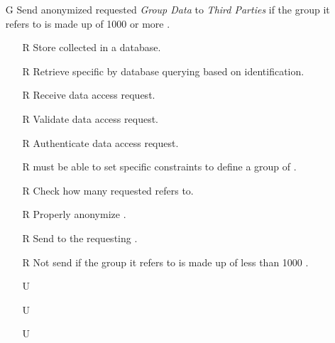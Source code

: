 \documentclass[../../rasd.tex]{subfiles}
\begin{document}
\begin{itemize}
            \item[G\subs{3}]Send anonymized requested \textit{Group Data} to \textit{Third Parties} if the group it refers to is made up of 1000 or more .
            \begin{itemize}
                \item[R\subs{11}]Store collected  in a database.
                \item[R\subs{12}]Retrieve specific  by database querying based on  identification.
                \item[R\subs{13}]Receive  data access request.
                \item[R\subs{14}]Validate  data access request.
                \item[R\subs{15}]Authenticate  data access request.
                \item[R\subs{21}] must be able to set specific constraints to define a group of .
                \item[R\subs{22}]Check how many  requested  refers to.
                \item[R\subs{23}]Properly anonymize .
                \item[R\subs{24}]Send  to the requesting .
                \item[R\subs{25}]Not send  if the group it refers to is made up of less than 1000 .
                \\
                \item[U\subs{2}] 
                \item[U\subs{4}] 
                \item[U\subs{6}] 
            \end{itemize}


\end{itemize}
\end{document}

